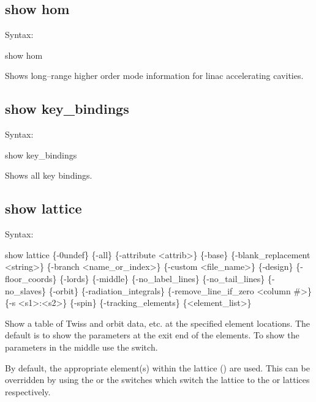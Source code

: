 {{{{{%

\subsection{show hom}
\label{s:show.hom}

Syntax:
\begin{example}
  show hom
\end{example}

Shows long--range higher order mode information for linac accelerating
cavities.


\subsection{show key_bindings}
\label{s:show.key}

Syntax:
\begin{example}
  show key_bindings
\end{example}


Shows all key bindings.


\subsection{show lattice}
\label{s:show.lattice}

Syntax:
\begin{example}
  show lattice \{-0undef\} \{-all\} \{-attribute <attrib>\} \{-base\}
      \{-blank_replacement <string>\}  \{-branch <name_or_index>\}
      \{-custom <file_name>\} \{-design\} \{-floor_coords\} \{-lords\} \{-middle\}
      \{-no_label_lines\} \{-no_tail_lines\} \{-no_slaves\} \{-orbit\} \{-radiation_integrals\}
      \{-remove_line_if_zero <column \#>\} \{-s <s1>:<s2>\} \{-spin\} \{-tracking_elements\}
      \{<element_list>\} 
\end{example}

Show a table of Twiss and orbit data, etc. at the specified element locations. The default
is to show the parameters at the exit end of the elements. To show the parameters in the
middle use the  switch.

By default, the appropriate element(s) within the  lattice ()
are used. This can be overridden by using the  or the  switches
which switch the lattice to the  or  lattices respectively.

}}}}}
